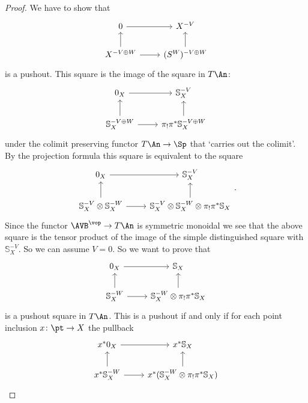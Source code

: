 \begin{proof}
    We have to show that 
    \[\begin{tikzcd}
        0 & {X^{-V}} \\
        {X^{-V\oplus W}} & {(S^{W})^{-V\oplus W}}
        \arrow[to=1-2, from=1-1]
        \arrow[to=1-1, from=2-1]
        \arrow[to=1-2, from=2-2]
        \arrow[to=2-2, from=2-1]
    \end{tikzcd}\]
    is a pushout.
    This square is the image of the square in $T\An$:
    \[\begin{tikzcd}
        {0_X} & {\mathbb S^{-V}_X} \\
        {\mathbb S_X^{-V\oplus W}} & {\pi_! \pi^* \mathbb S_X^{-V\oplus W}}
        \arrow[to=1-2, from=1-1]
        \arrow[to=1-1, from=2-1]
        \arrow[to=1-2, from=2-2]
        \arrow[to=2-2, from=2-1]
    \end{tikzcd}\]
    under the colimit preserving functor $T\An \to \Sp$ that `carries out the colimit'.
    By the projection formula this square is equivalent to the square 
    \[\begin{tikzcd}
        {0_X} & {\mathbb S^{-V}_X} \\
        {\mathbb S_X^{-V} \otimes \mathbb S_X^{-W}} & {\mathbb S_X^{-V} \otimes \mathbb S_X^{-W}\otimes\pi_! \pi^* \mathbb S_X}
        \arrow[to=1-2, from=1-1]
        \arrow[to=1-1, from=2-1]
        \arrow[to=1-2, from=2-2]
        \arrow[to=2-2, from=2-1]
    \end{tikzcd}.\]
    Since the functor $\AVB^\vop \to T\An$ is symmetric monoidal we see that the above square is the tensor product of the image of 
    the simple distinguished square with $\mathbb S_X^{-V}$. So we can assume $V = 0$. So we want to prove that 
\[\begin{tikzcd}
	{0_X} & {\mathbb S_X} \\
	{\mathbb S_X^{-W}} & {\mathbb S_X^{-W}\otimes\pi_! \pi^* \mathbb S_X}
	\arrow[to=1-2, from=1-1]
	\arrow[to=1-1, from=2-1]
	\arrow[to=1-2, from=2-2]
	\arrow[to=2-2, from=2-1]
\end{tikzcd}\]
is a pushout square in $T\An$. This is a pushout if and only if for each point inclusion $x \colon \pt \to X$ the pullback 
\[\begin{tikzcd}
	{x^*0_X} & {x^*\mathbb S_X} \\
	{x^*\mathbb S_X^{-W}} & {x^*(\mathbb S_X^{-W}\otimes\pi_! \pi^* \mathbb S_X)}
	\arrow[to=1-2, from=1-1]
	\arrow[to=1-1, from=2-1]
	\arrow[to=1-2, from=2-2]
	\arrow[to=2-2, from=2-1]
\end{tikzcd}\]

\end{proof}
